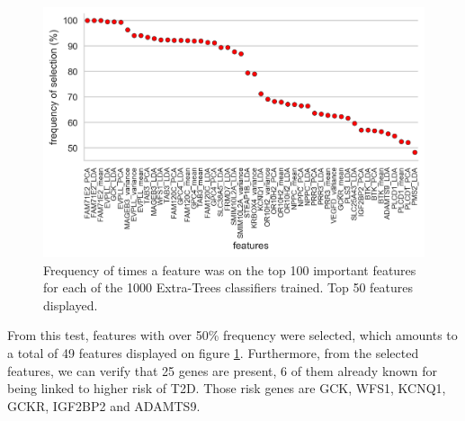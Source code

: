 \begin{figure}[h]
	\centering
	\includegraphics[width=\textwidth]{../images/feature_extraction/top50_features.png}
	\caption{Frequency of times a feature was on the top 100 important features for each of
		the 1000 Extra-Trees classifiers trained. Top 50 features displayed. } 
	\label{fig:top_features}
\end{figure}

From this test, features with over 50\% frequency were selected, which amounts to a total of 49 features displayed on figure \ref{fig:top_features}. Furthermore, from the selected features, we can verify that 25 genes are present, 6 of them already known for being linked to higher risk of T2D. Those risk genes are GCK, WFS1, KCNQ1, GCKR, IGF2BP2 and ADAMTS9. 


